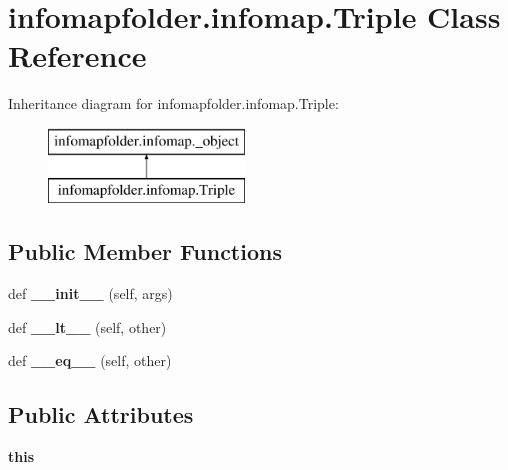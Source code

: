 \hypertarget{classinfomapfolder_1_1infomap_1_1Triple}{}\section{infomapfolder.\+infomap.\+Triple Class Reference}
\label{classinfomapfolder_1_1infomap_1_1Triple}
Inheritance diagram for infomapfolder.\+infomap.\+Triple\+:\begin{figure}[H]
\begin{center}
\leavevmode
\includegraphics[height=2.000000cm]{classinfomapfolder_1_1infomap_1_1Triple}
\end{center}
\end{figure}
\subsection*{Public Member Functions}
\begin{DoxyCompactItemize}
\item 
\mbox{\label{classinfomapfolder_1_1infomap_1_1Triple_ae9dc768415be408f25b29185ff79d381}} 
def {\bfseries \+\_\+\+\_\+init\+\_\+\+\_\+} (self, args)
\item 
\mbox{\label{classinfomapfolder_1_1infomap_1_1Triple_a8168e662774da73a0e2d73ac09fd7ae7}} 
def {\bfseries \+\_\+\+\_\+lt\+\_\+\+\_\+} (self, other)
\item 
\mbox{\label{classinfomapfolder_1_1infomap_1_1Triple_a12b25fc58c7053a353dd97300f0857d0}} 
def {\bfseries \+\_\+\+\_\+eq\+\_\+\+\_\+} (self, other)
\end{DoxyCompactItemize}
\subsection*{Public Attributes}
\begin{DoxyCompactItemize}
\item 
\mbox{\label{classinfomapfolder_1_1infomap_1_1Triple_ac8910295286966f7f1076b159ff7c743}} 
{\bfseries this}
\end{DoxyCompactItemize}
